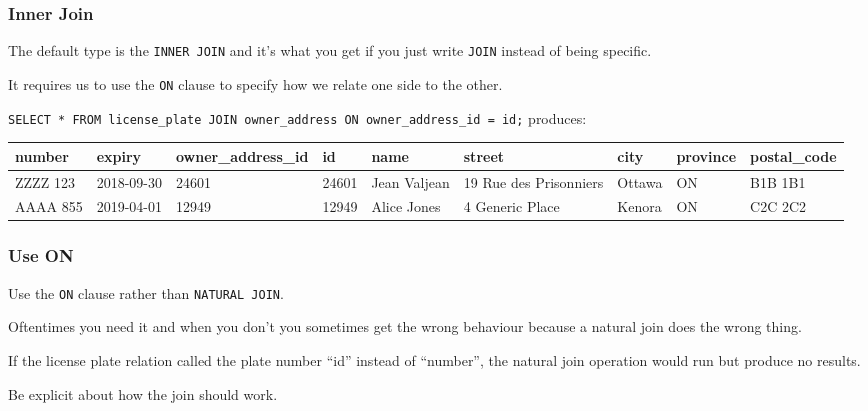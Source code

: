\begin{frame}
\frametitle{Inner Join}

The default type is the \texttt{INNER JOIN} and it's what you get if you just write \texttt{JOIN} instead of being specific. 

It requires us to use the \texttt{ON} clause to specify how we relate one side to the other.

\texttt{SELECT * FROM license\_plate JOIN owner\_address ON owner\_address\_id = id;} produces:

{\tiny
\begin{center}
	\begin{tabular}{|l|l|l|l|l|l|l|l|l|}\hline
		\textbf{number} & \textbf{expiry} & \textbf{owner\_address\_id} & \textbf{id} & \textbf{name} &\textbf{street} & \textbf{city} & \textbf{province} & \textbf{postal\_code} \\ \hline
		ZZZZ 123 & 2018-09-30 & 24601 & 24601 & Jean Valjean & 19 Rue des Prisonniers & Ottawa & ON & B1B 1B1\\ \hline
		AAAA 855 & 2019-04-01 & 12949 & 12949 & Alice Jones & 4 Generic Place & Kenora & ON & C2C 2C2\\ \hline
	\end{tabular}
\end{center}
}

\end{frame}



\begin{frame}
\frametitle{Use ON}

Use the \texttt{ON} clause rather than \texttt{NATURAL JOIN}. 

Oftentimes you need it and when you don't you sometimes get the wrong behaviour because a natural join does the wrong thing. 

If the license plate relation called the plate number ``id'' instead of ``number'', the natural join operation would run but produce no results. 

Be explicit about how the join should work.


\end{frame}




